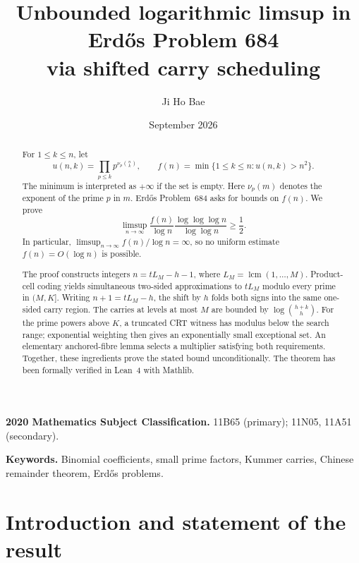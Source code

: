 \documentclass[11pt]{article}
\title{Unbounded logarithmic limsup in Erd\H{o}s Problem 684\\
via shifted carry scheduling}
\author{Ji Ho Bae}
\date{September 2026}
\theoremstyle{remark}
\DeclareMathOperator{\lcm}{lcm}
\begin{document}
\maketitle

\begin{abstract}
For \(1\leq k\leq n\), let
\[
 u(n,k)=\prod_{p\leq k}p^{\nu_p\binom nk},
 \qquad
 f(n)=\min\{1\leq k\leq n:u(n,k)>n^2\}.
\]
The minimum is interpreted as \(+\infty\) if the set is empty.
Here \(\nu_p(m)\) denotes the exponent of the prime \(p\) in \(m\).
Erd\H{o}s Problem~684 asks for bounds on \(f(n)\).  We prove
\[
 \limsup_{n\to\infty}
 \frac{f(n)}{\log n}
 \frac{\log\log\log n}{\log\log n}\geq \frac12.
\]
In particular,
\(\limsup_{n\to\infty}f(n)/\log n=\infty\), so no uniform estimate
\(f(n)=O(\log n)\) is possible.

The proof constructs integers \(n=tL_M-h-1\), where
\(L_M=\lcm(1,\ldots,M)\).  Product-cell coding yields simultaneous two-sided
approximations to \(tL_M\) modulo every prime in \((M,K]\).  Writing
\(n+1=tL_M-h\), the shift by \(h\) folds both signs into the same one-sided
carry region.  The carries at levels at most \(M\) are bounded by
\(\log\binom{h+k}{h}\).  For the prime powers above \(K\), a truncated CRT
witness has modulus below the search range; exponential weighting then gives
an exponentially small exceptional set.  An elementary anchored-fibre lemma
selects a multiplier satisfying both requirements.  Together, these
ingredients prove the stated bound unconditionally.  The theorem has been
formally verified in Lean~4 with Mathlib.
\end{abstract}

\medskip
\noindent\textbf{2020 Mathematics Subject Classification.}
11B65 (primary); 11N05, 11A51 (secondary).

\smallskip
\noindent\textbf{Keywords.}
Binomial coefficients, small prime factors, Kummer carries, Chinese
remainder theorem, Erd\H{o}s problems.

\section{Introduction and statement of the result}
\end{document}
